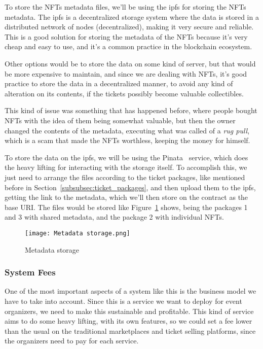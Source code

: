 To store the NFTs metadata files, we'll be using the \gls{ipfs} for storing the
NFTs metadata. The \gls{ipfs} is a decentralized storage system where the data
is stored in a distributed network of nodes (decentralized), making it very
secure and reliable. This is a good solution for storing the metadata of the
NFTs because it's very cheap and easy to use, and it's a common practice in the
blockchain ecosystem.

Other options would be to store the data on some kind of server, but that would
be more expensive to maintain, and since we are dealing with NFTs, it's good
practice to store the data in a decentralized manner, to avoid any kind of
alteration on its contents, if the tickets possibly become valuable
collectibles.

This kind of issue was something that has happened before, where people bought
NFTs with the idea of them being somewhat valuable, but then the owner changed
the contents of the metadata, executing what was called of a \textit{rug pull},
which is a scam that made the NFTs worthless, keeping the money for himself.

To store the data on the \gls{ipfs}, we will be using the Pinata~\cite{pinata}
service, which does the heavy lifting for interacting with the storage itself.
To accomplish this, we just need to arrange the files according to the ticket
packages, like mentioned before in Section~\ref{subsubsec:ticket_packages}, and
then upload them to the \gls{ipfs}, getting the link to the metadata, which
we'll then store on the contract as the base URI. The files would be stored
like Figure~\ref{fig:metadata_storage} shows, being the packages 1 and 3 with
shared metadata, and the package 2 with individual NFTs.

\begin{figure}[H]
	\texttt{[image: Metadata storage.png]}
	\centering
	\caption{Metadata storage}\label{fig:metadata_storage}
\end{figure}

\subsubsection{System Fees}\label{subsubsec:system_fees}

One of the most important aspects of a system like this is the business model
we have to take into account. Since this is a service we want to deploy for
event organizers, we need to make this sustainable and profitable. This kind of
service aims to do some heavy lifting, with its own features, so we could set a
fee lower than the usual on the traditional marketplaces and ticket selling
platforms, since the organizers need to pay for each service.

